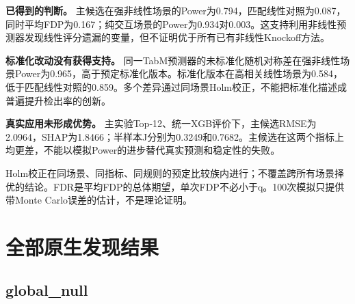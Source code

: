 \documentclass[UTF8,11pt,a4paper]{ctexart}
\begin{document}
\textbf{已得到的判断。} 主候选在强非线性场景的Power为0.794，匹配线性对照为0.087，同时平均FDP为0.167；纯交互场景的Power为0.934对0.003。这支持利用非线性预测器发现线性评分遗漏的变量，但不证明优于所有已有非线性Knockoff方法。

\textbf{标准化改动没有获得支持。} 同一TabM预测器的未标准化随机对称差在强非线性场景Power为0.965，高于预定标准化版本。标准化版本在高相关线性场景为0.584，低于匹配线性对照的0.859。多个差异通过同场景Holm校正，不能把标准化描述成普遍提升检出率的创新。

\textbf{真实应用未形成优势。} 主实验Top-12、统一XGB评价下，主候选RMSE为2.0964，SHAP为1.8466；半样本J分别为0.3249和0.7682。主候选在这两个指标上均更差，不能以模拟Power的进步替代真实预测和稳定性的失败。

Holm校正在同场景、同指标、同规则的预定比较族内进行；不覆盖跨所有场景择优的结论。FDR是平均FDP的总体期望，单次FDP不必小于q。100次模拟只提供带Monte Carlo误差的估计，不是理论证明。

\section{全部原生发现结果}\label{ux5168ux90e8ux539fux751fux53d1ux73b0ux7ed3ux679c}

\subsection{global\_null}\label{global_null}
\end{document}
